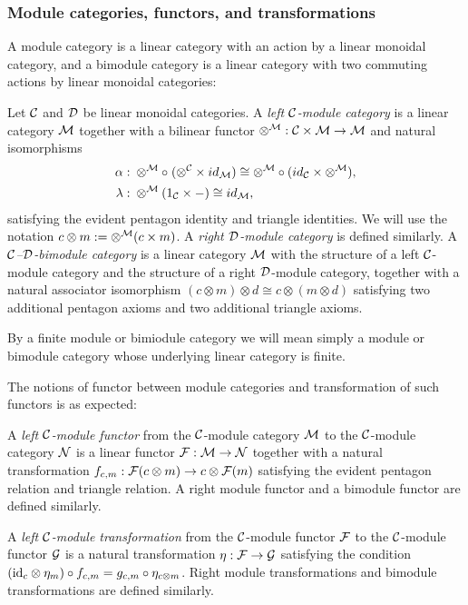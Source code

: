 \documentclass{amsart}
\begin{document}
\subsubsection{Module categories, functors, and transformations}

A module category is a linear category with an action by a linear monoidal category, and a bimodule category is a linear category with two commuting actions by linear monoidal categories:
\begin{definition}
Let $\mathcal C$ and $\mathcal D$ be linear monoidal categories.
A \emph{left $\mathcal C$-module category} is a linear category $\mathcal M$ together with a bilinear functor $\otimes^{\mathcal M}: \mathcal C \times \mathcal M \to \mathcal M$ and natural isomorphisms
\begin{align*}
		\alpha: & \;    \otimes^{\mathcal M} \circ \; (\otimes^{\mathcal C} \times id_{\mathcal M}) \cong  \otimes^{\mathcal M} \circ (id_{\mathcal C} \times \otimes^{\mathcal M}), \\
		\lambda: & \; \otimes^{\mathcal M} (1_{\mathcal C} \times -) \cong id_{\mathcal M},
\end{align*}
satisfying the evident pentagon identity and triangle identities.  We will use the notation $c \otimes m := \otimes^\mathcal M(c \times m)$.  A \emph{right $\mathcal D$-module category} is defined similarly.  A \emph{$\mathcal C$--$\mathcal D$-bimodule category} is a linear category $\mathcal M$ with the structure of a left $\mathcal C$-module category and the structure of a right $\mathcal D$-module category, together with a natural associator isomorphism $(c \otimes m) \otimes d \cong c \otimes (m \otimes d)$ satisfying two additional pentagon axioms and two additional triangle axioms.  
\end{definition}
\nid By a finite module or bimiodule category we will mean simply a module or bimodule category whose underlying linear category is finite.

The notions of functor between module categories and transformation of such functors is as expected:
\begin{definition}
A \emph{left $\mathcal C$-module functor} from the $\mathcal C$-module category $\mathcal M$ to the $\mathcal C$-module category $\mathcal N$ is a linear functor $\mathcal F: \mathcal M \rightarrow \mathcal N$ together with a natural transformation $f_{c,m}:\mathcal F(c \otimes m) \rightarrow c \otimes \mathcal F(m)$ satisfying the evident pentagon relation and triangle relation.  A right module functor and a bimodule functor are defined similarly.
\end{definition}
\begin{definition}
A \emph{left $\mathcal C$-module transformation} from the $\mathcal C$-module functor $\mathcal F$ to the $\mathcal C$-module functor $\mathcal G$ is a natural transformation $\eta: \mathcal F \rightarrow \mathcal G$ satisfying the condition $(\mathrm{id}_c \otimes \eta_m) \circ f_{c,m} = g_{c,m} \circ \eta_{c \otimes m}$.  Right module transformations and bimodule transformations are defined similarly.
\end{definition}
\end{document}
